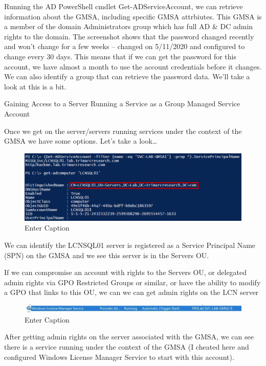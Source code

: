 Running the AD PowerShell cmdlet Get-ADServiceAccount, we can retrieve information about the GMSA, including specific GMSA attrbiutes. This GMSA is a member of the domain Administrators group which has full AD \& DC admin rights to the domain. The screenshot shows that the password changed recently and won’t change for a few weeks – changed on 5/11/2020 and configured to change every 30 days. This means that if we can get the password for this account, we have almost a month to use the account credentials before it changes. We can also identify a group that can retrieve the password data. We’ll take a look at this is a bit.

Gaining Access to a Server Running a Service as a Group Managed Service Account

Once we get on the server/servers running services under the context of the GMSA we have some options. Let’s take a look…

\begin{figure}
    \centering
    \includegraphics[width=0.75\linewidth]{srvcacct.png}
    \caption{Enter Caption}
    \label{fig:placeholder}
\end{figure}

We can identify the LCNSQL01 server is registered as a Service Principal Name (SPN) on the GMSA and we see this server is in the Servers OU.

If we can compromise an account with rights to the Servers OU, or delegated admin rights via GPO Restricted Groups or similar, or have the ability to modify a GPO that links to this OU, we can we can get admin rights on the LCN server
\begin{figure}
    \centering
    \includegraphics[width=0.75\linewidth]{lcnsrv.png}
    \caption{Enter Caption}
    \label{fig:placeholder}
\end{figure}

After getting admin rights on the server associated with the GMSA, we can see there is a service running under the context of the GMSA (I cheated here and configured Windows License Manager Service to start with this account).

